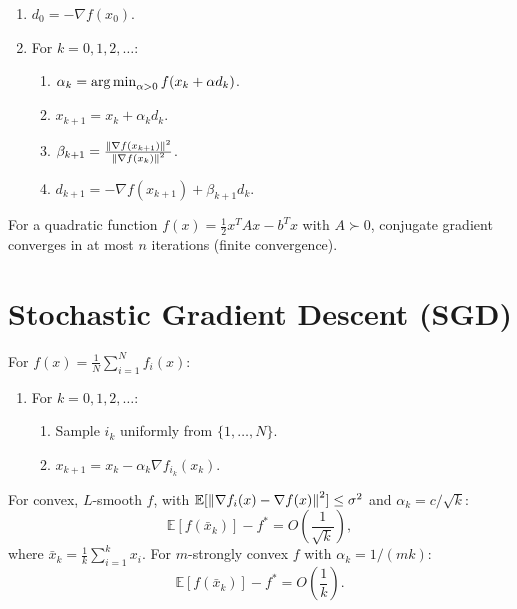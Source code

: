 \begin{algorithme}[title=\textbf{Nonlinear Conjugate Gradient (Fletcher--Reeves)}]
\begin{enumerate}
    \item $d_0 = -\nabla f(x_0)$.
    \item For $k = 0, 1, 2, \ldots$:
    \begin{enumerate}
        \item $\alpha_k = \operatorname*{arg\,min}_{\alpha > 0} f(x_k + \alpha d_k)$.
        \item $x_{k+1} = x_k + \alpha_k d_k$.
        \item $\beta_{k+1} = \frac{\left\| \nabla f(x_{k+1}) \right\|^2}{\left\| \nabla f(x_k) \right\|^2}$.
        \item $d_{k+1} = -\nabla f(x_{k+1}) + \beta_{k+1} d_k$.
    \end{enumerate}
\end{enumerate}
\end{algorithme}

\begin{remark}
For a quadratic function $f(x) = \frac{1}{2}x^TAx - b^Tx$ with $A \succ 0$,
conjugate gradient converges in at most $n$ iterations (finite convergence).
\end{remark}

\section{Stochastic Gradient Descent (SGD)}

\begin{algorithme}[title=\textbf{Stochastic Gradient Descent}]
For $f(x) = \frac{1}{N}\sum_{i=1}^N f_i(x)$:
\begin{enumerate}
    \item For $k = 0, 1, 2, \ldots$:
    \begin{enumerate}
        \item Sample $i_k$ uniformly from $\{1, \ldots, N\}$.
        \item $x_{k+1} = x_k - \alpha_k \nabla f_{i_k}(x_k)$.
    \end{enumerate}
\end{enumerate}
\end{algorithme}

\begin{theorem}
For convex, $L$-smooth $f$, with
$\mathbb{E}[\left\| \nabla f_i(x) - \nabla f(x) \right\|^2] \leq \sigma^2$ and
$\alpha_k = c/\sqrt{k}$:
\[
    \mathbb{E}[f(\bar{x}_k)] - f^* = O\left(\frac{1}{\sqrt{k}}\right),
\]
where $\bar{x}_k = \frac{1}{k}\sum_{i=1}^k x_i$. For $m$-strongly convex $f$ with
$\alpha_k = 1/(mk)$:
\[
    \mathbb{E}[f(\bar{x}_k)] - f^* = O\left(\frac{1}{k}\right).
\]
\end{theorem}


